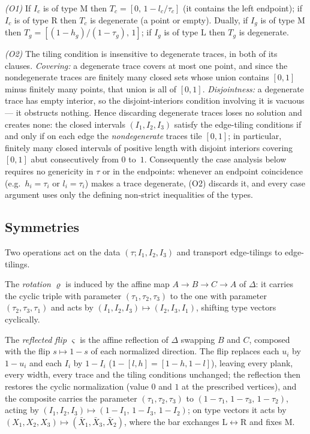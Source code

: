 \documentclass{aims}
\numberwithin{equation}{section}
\theoremstyle{plain}
\theoremstyle{definition}
\theoremstyle{remark}
\begin{document}
\emph{(O1)} If $I_c$ is of type $\mathrm M$ then $T_c=[0,\,1-l_c/\tau_c]$ (it
contains the left endpoint); if $I_c$ is of type $\mathrm R$ then $T_c$ is
degenerate (a point or empty). Dually, if $I_g$ is of type $\mathrm M$ then
$T_g=[(1-h_g)/(1-\tau_g),\,1]$; if $I_g$ is of type $\mathrm L$ then $T_g$ is
degenerate.

\emph{(O2)} The tiling condition is insensitive to degenerate traces, in both
of its clauses. \emph{Covering:} a degenerate trace covers at most one point,
and since the nondegenerate traces are finitely many closed sets whose union
contains $[0,1]$ minus finitely many points, that union is all of $[0,1]$.
\emph{Disjointness:} a degenerate trace has empty interior, so the
disjoint-interiors condition involving it is vacuous --- it obstructs
nothing. Hence discarding degenerate traces loses no solution and creates
none: the closed intervals $(I_1,I_2,I_3)$ satisfy the edge-tiling conditions
if and only if on each edge the \emph{nondegenerate} traces tile $[0,1]$; in
particular, finitely many closed intervals of positive
length with disjoint interiors covering $[0,1]$ abut consecutively from $0$
to~$1$. Consequently the case analysis below requires no genericity in $\tau$
or in the endpoints: whenever an endpoint coincidence (e.g.\ $h_i=\tau_i$ or
$l_i=\tau_i$) makes a trace degenerate, (O2) discards it, and every case
argument uses only the defining non-strict inequalities of the types.

\subsection*{Symmetries}
Two operations act on the data $(\tau;I_1,I_2,I_3)$ and transport edge-tilings
to edge-tilings.

The \emph{rotation} $\varrho$ is induced by the affine map $A\to B\to C\to A$
of $\Delta$: it carries the cyclic triple with parameter
$(\tau_1,\tau_2,\tau_3)$ to the one with parameter $(\tau_2,\tau_3,\tau_1)$ and
acts by $(I_1,I_2,I_3)\mapsto(I_2,I_3,I_1)$, shifting type vectors cyclically.

The \emph{reflected flip} $\varsigma$ is the affine reflection of $\Delta$
swapping $B$ and $C$, composed with the flip $s\mapsto1-s$ of each normalized
direction. The flip replaces each $u_i$ by $1-u_i$ and each $I_i$ by $1-I_i$
($1-[l,h]=[1-h,1-l]$), leaving every plank, every width, every trace and the
tiling conditions unchanged; the reflection then restores the cyclic
normalization (value $0$ and $1$ at the prescribed vertices), and the composite
carries the parameter $(\tau_1,\tau_2,\tau_3)$ to
$(1-\tau_1,\,1-\tau_3,\,1-\tau_2)$, acting by
$(I_1,I_2,I_3)\mapsto(1-I_1,\,1-I_3,\,1-I_2)$; on type vectors it acts by
$(X_1,X_2,X_3)\mapsto(\bar X_1,\bar X_3,\bar X_2)$, where the bar exchanges
$\mathrm L\leftrightarrow\mathrm R$ and fixes $\mathrm M$.
\end{document}
